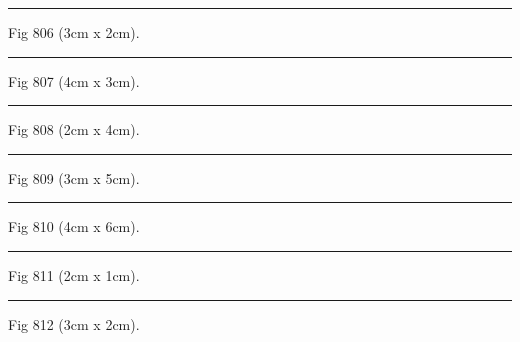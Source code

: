 \documentclass[a4paper,11pt]{article}
\begin{document}
\begin{swarmwrap}%
  \begin{minipage}[t]{3cm}
    \centering
    \rule{\linewidth}{2cm}
    {\footnotesize Fig 806 (3cm x 2cm).}
  \end{minipage}%
\end{swarmwrap}%
\swarmwrapnext
\lipsum[56]%

\begin{swarmwrap}%
  \begin{minipage}[t]{4cm}
    \centering
    \rule{\linewidth}{3cm}
    {\footnotesize Fig 807 (4cm x 3cm).}
  \end{minipage}%
\end{swarmwrap}%
\swarmwrapnext
\lipsum[57]%

\begin{swarmwrap}%
  \begin{minipage}[t]{2cm}
    \centering
    \rule{\linewidth}{4cm}
    {\footnotesize Fig 808 (2cm x 4cm).}
  \end{minipage}%
\end{swarmwrap}%
\swarmwrapnext
\lipsum[58]%

\begin{swarmwrap}%
  \begin{minipage}[t]{3cm}
    \centering
    \rule{\linewidth}{5cm}
    {\footnotesize Fig 809 (3cm x 5cm).}
  \end{minipage}%
\end{swarmwrap}%
\swarmwrapnext
\lipsum[59]%

\begin{swarmwrap}%
  \begin{minipage}[t]{4cm}
    \centering
    \rule{\linewidth}{6cm}
    {\footnotesize Fig 810 (4cm x 6cm).}
  \end{minipage}%
\end{swarmwrap}%
\swarmwrapnext
\lipsum[60]%

\begin{swarmwrap}%
  \begin{minipage}[t]{2cm}
    \centering
    \rule{\linewidth}{1cm}
    {\footnotesize Fig 811 (2cm x 1cm).}
  \end{minipage}%
\end{swarmwrap}%
\swarmwrapnext
\lipsum[61]%

\begin{swarmwrap}%
  \begin{minipage}[t]{3cm}
    \centering
    \rule{\linewidth}{2cm}
    {\footnotesize Fig 812 (3cm x 2cm).}
  \end{minipage}%
\end{swarmwrap}%
\swarmwrapnext
\lipsum[62]%
\end{document}
